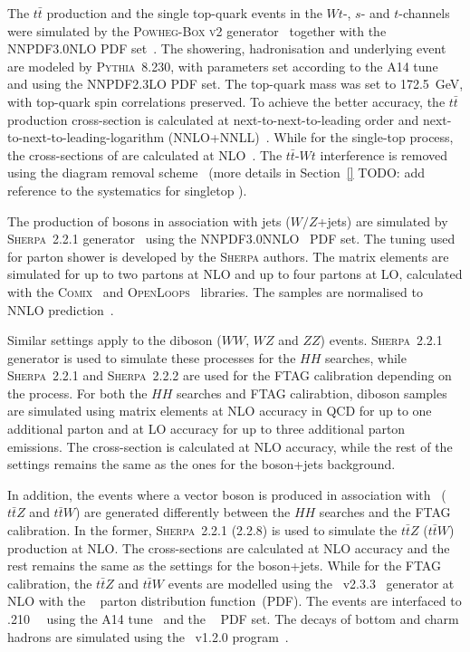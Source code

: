 The $t\bar{t}$ production and the single top-quark events 
in the $Wt$-, $s$- and $t$-channels
were simulated by the \textsc{Powheg-Box v2} generator~
\cite{Frixione:2007nw,Nason:2004rx,Frixione:2007vw,Alioli:2010xd}
together with the \textsc{NNPDF3.0NLO} PDF set~\cite{Ball:2014uwa}.
The showering, hadronisation and underlying event 
are modeled by \textsc{Pythia~8.230},
with parameters set according to the A14 tune~\cite{ATL-PHYS-PUB-2017-007}
and using the \textsc{NNPDF2.3LO} PDF set.
The top-quark mass was set to 172.5~GeV,
with top-quark spin correlations preserved.
To achieve the better accuracy, 
the $t\bar{t}$ production cross-section is calculated
at next-to-next-to-leading order 
and next-to-next-to-leading-logarithm 
(NNLO+NNLL)~\cite{Czakon:2011xx}.
While for the single-top process, 
the cross-sections of are calculated at
NLO~\cite{stop_sch_Xsec,stop_tch_Xsec,Kidonakis:2010ux}.
The $t\bar{t}$-$Wt$ interference is removed
using the diagram removal scheme~\cite{Frixione:2008yi}
(more details in Section~\ref{} TODO: add reference to the systematics for singletop ).

The production of bosons in association with jets 
($W/Z$+jets) are simulated by 
\textsc{Sherpa}~2.2.1 generator~\cite{Bothmann:2019yzt}
using the NNPDF3.0NNLO~\cite{Ball:2014uwa} PDF set.
The tuning used for parton shower is developed by the 
\textsc{Sherpa} authors. 
The matrix elements are simulated for up to two partons at
NLO and up to four partons at LO, calculated with the 
\textsc{Comix}~\cite{Gleisberg:2008fv} and 
\textsc{OpenLoops}~\cite{Cascioli:2011va} libraries.
The samples are normalised to NNLO prediction~\cite{Anastasiou:2003ds}.

Similar settings apply to the diboson ($WW$, $WZ$ and $ZZ$) events.
\textsc{Sherpa}~2.2.1 generator is used to simulate these processes
for the $HH$ searches, while \textsc{Sherpa}~2.2.1 and \textsc{Sherpa}~2.2.2
are used for the FTAG calibration depending on the process.
For both the $HH$ searches and FTAG calirabtion, 
diboson samples are simulated using
matrix elements at NLO accuracy in QCD for up to one additional parton
and at LO accuracy for up to three additional parton emissions.
The cross-section is calculated at NLO accuracy, while
the rest of the settings remains the same as the ones for the boson+jets background.

In addition, the events where
a vector boson is produced in association with \ttbar\
($t\bar tZ$ and $t\bar tW$) are generated differently
between the $HH$ searches and the FTAG calibration.
In the former,
\textsc{Sherpa}~2.2.1 (2.2.8) is used to simulate the
$t\bar tZ$ ($t\bar tW$) production at NLO.
The cross-sections are calculated at NLO accuracy and 
the rest remains the same as the settings for the boson+jets. 
While for the FTAG calibration,
the $t\bar tZ$ and $t\bar tW$ events are modelled using the
\mgamc~v2.3.3~\cite{Alwall:2014hca} generator at NLO with the
\nnpdfnlo~\cite{Ball:2014uwa} parton distribution function~(PDF).
The events are interfaced to \pythia.210~\cite{Sjostrand:2014zea}~
using the A14 tune~\cite{ATL-PHYS-PUB-2014-021} and the
\nnpdftwo~\cite{Ball:2014uwa} PDF set. The decays of bottom and charm
hadrons are simulated using the \evtgen\ v1.2.0 program~\cite{Lange:2001uf}.


